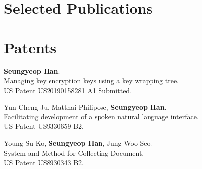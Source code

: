 \documentclass[line]{res}
\begin{document}
\begin{resume}
\section{Selected Publications}
\nocite{*}



\section{Patents}
\textbf{Seungyeop Han}. \\
Managing key encryption keys using a key wrapping tree. \\
US Patent US20190158281 A1 Submitted.

Yun-Cheng Ju, Matthai Philipose, \textbf{Seungyeop Han}. \\
Facilitating development of a spoken natural language interface. \\
US Patent US9330659 B2.

Young Su Ko, \textbf{Seungyeop Han}, Jung Woo Seo. \\
System and Method for Collecting Document. \\
US Patent US8930343 B2. 








\end{resume}
\end{document}

